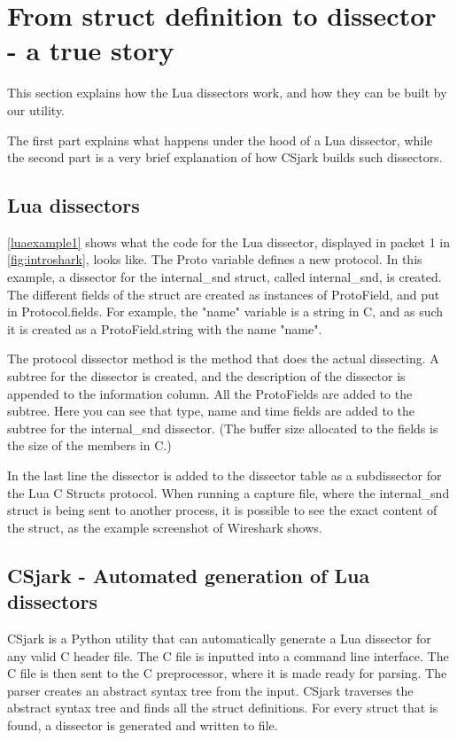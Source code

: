 \section*{From struct definition to dissector - a true story}
This section explains how the Lua dissectors work, and how they can be built by our utility.

The first part explains what happens under the hood of a Lua dissector, while 
the second part is a very brief explanation of how CSjark builds such dissectors.

\subsection*{Lua dissectors}

\autoref{luaexample1} shows what the code for the Lua dissector, displayed in packet 1 in \autoref{fig:introshark}, looks like.
The Proto variable defines a new protocol. In this example, a dissector for the internal\_snd struct, called internal\_snd, is created. 
The different fields of the struct are created as instances of ProtoField, and put in Protocol.fields.
For example, the "name" variable is a string in C, and as such it is created as a ProtoField.string with the 
name "name".

The protocol dissector method is the method that does the actual dissecting.
A subtree for the dissector is created, and the description of the dissector is appended to the information column.
All the ProtoFields are added to the subtree. Here you can see that type, name and time fields are added to the subtree for the internal\_snd dissector.
(The buffer size allocated to the fields is the size of the members in C.)

In the last line the dissector is added to the dissector table as a subdissector for the Lua C Structs protocol.
When running a capture file, where the internal\_snd struct is being sent to another process, it is possible to see the exact content of the struct,
as the example screenshot of Wireshark shows.



\subsection*{CSjark - Automated generation of Lua dissectors}
CSjark is a Python utility that can automatically generate a Lua dissector for 
any valid C header file. The C file is inputted into a command line interface.
The C file is then sent to the C preprocessor, where it is made ready for parsing.
The parser creates an abstract syntax tree from the input.
CSjark traverses the abstract syntax tree and finds all the struct definitions.
For every struct that is found, a dissector is generated and written to file.







